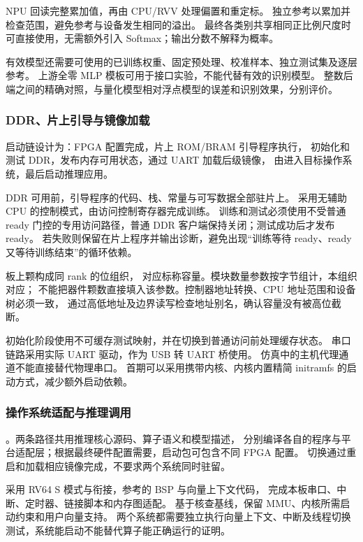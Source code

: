 NPU 回读\ModelAccumulatorType{}完整累加值，再由 CPU/RVV 处理偏置和重定标。
独立参考以\ReferenceAccumulatorType{}累加并检查范围，避免参考与设备发生相同的溢出。
最终各类别共享相同正比例尺度时可直接使用\ModelOutputOperation{}，无需额外引入 Softmax；输出分数不解释为概率。\cite{gemminilib}

有效模型还需要可使用的已训练权重、固定预处理、校准样本、独立测试集及逐层参考。
上游全零 MLP 模板可用于接口实验，不能代替有效的识别模型。
整数后端之间的精确对照，与量化模型相对浮点模型的误差和识别效果，分别评价。

\subsubsection{DDR、片上引导与镜像加载}
启动链设计为：FPGA 配置完成，片上 ROM/BRAM 引导程序执行，
初始化和测试 DDR，发布内存可用状态，通过 UART 加载后级镜像，
由\BootFirmware{}进入目标操作系统，最后启动推理应用。

DDR 可用前，引导程序的代码、栈、常量与可写数据全部驻片上。
\MemoryController{}采用无辅助 CPU 的控制模式，由\ProcessorCore{}访问控制寄存器完成训练。
训练和测试必须使用不受普通 ready 门控的专用访问路径，普通 DDR 客户端保持关闭；测试成功后才发布 ready。
若失败则保留在片上程序并输出诊断，避免出现“训练等待 ready、ready 又等待训练结束”的循环依赖。\cite{litedraminit}

板上\MemoryChipCount{}颗\MemoryPart{}构成同 rank 的\MemoryBusWidth{}位组织，
对应\MemoryCapacity{}标称容量。\MemoryController{}模块数量参数按字节组计，本组织对应\MemoryByteGroups{}；
不能把器件颗数直接填入该参数。控制器地址转换、CPU 地址范围和设备树必须一致，
通过高低地址及边界读写检查地址别名，确认容量没有被高位截断。\cite{board,litedram}

初始化阶段使用不可缓存测试映射，并在切换到普通访问前处理缓存状态。
串口链路采用实际 UART 驱动，\SerialBridge{}作为 USB 转 UART 桥使用。
仿真中的主机代理通道不能直接替代物理串口。
首期\LinuxDistribution{}可以采用\BootFirmware{}携带内核、内核内置精简 initramfs 的启动方式，减少额外启动依赖。

\subsubsection{操作系统适配与推理调用}
\HybridDeploymentPlan{}。两条路径共用推理核心源码、算子语义和模型描述，
分别编译各自的程序与平台适配层；根据最终硬件配置需要，启动包可包含不同 FPGA 配置。
切换通过重启和加载相应镜像完成，不要求两个系统同时驻留。

\RealTimeSystem{}采用 RV64 S 模式与\BootFirmware{}衔接，参考\RealTimeSystemVersion{}的 BSP 与向量上下文代码，
完成本板串口、中断、定时器、链接脚本和内存图适配。
\LinuxDistribution{}基于\LinuxKernelVersion{}核查基线，保留 MMU、内核所需启动约束和用户向量支持。
两个系统都需要独立执行向量上下文、中断及线程切换测试，系统能启动不能替代算子能正确运行的证明。\cite{rtthread,linux}

